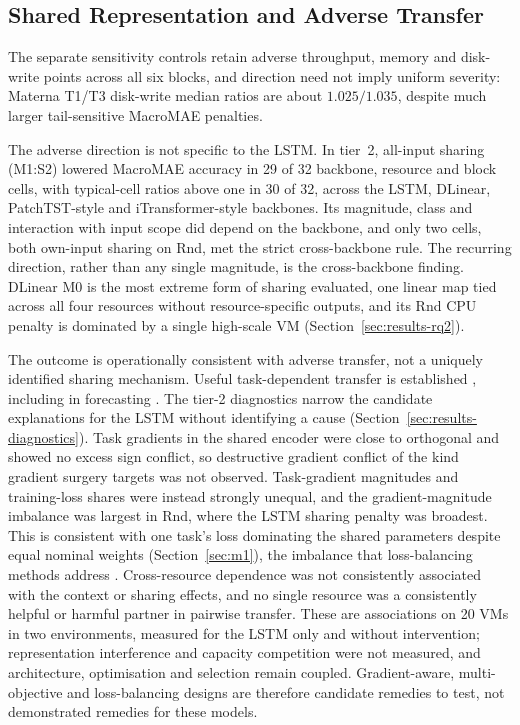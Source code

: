 \documentclass[5p,twocolumn]{elsarticle}
\begin{document}
\subsection{Shared Representation and Adverse Transfer}
\label{sec:discussion-sharing}

The separate sensitivity controls retain adverse throughput, memory and
disk-write points across all six blocks, and direction need not imply uniform
severity: Materna T1/T3 disk-write median ratios are about $1.025/1.035$,
despite much larger tail-sensitive MacroMAE penalties.

The adverse direction is not specific to the LSTM. In tier~2, all-input
sharing (M1:S2) lowered MacroMAE accuracy in 29 of 32 backbone, resource and
block cells, with typical-cell ratios above one in 30 of 32, across the
LSTM, DLinear, PatchTST-style and iTransformer-style backbones. Its
magnitude, class and interaction with input scope did depend on the
backbone, and only two cells, both own-input sharing on Rnd, met the strict
cross-backbone rule. The recurring direction, rather than any single
magnitude, is the cross-backbone finding. DLinear M0 is the most extreme
form of sharing evaluated, one linear map tied across all four resources
without resource-specific outputs, and its Rnd CPU penalty is dominated by a
single high-scale VM (Section~\ref{sec:results-rq2}).

The outcome is operationally consistent with adverse transfer, not a uniquely
identified sharing mechanism. Useful task-dependent transfer is established
\citep{Caruana1997Multitask,Standley2020TaskGrouping,Fifty2021TaskGroupings},
including in forecasting \citep{Nikentari2022NARMAXLSTM,Nochumsohn2025MTLinear}.
The tier-2 diagnostics narrow the candidate explanations for the LSTM
without identifying a cause (Section~\ref{sec:results-diagnostics}). Task
gradients in the shared encoder were close to orthogonal and showed no
excess sign conflict, so destructive gradient conflict of the kind gradient
surgery targets \citep{Yu2020GradientSurgery} was not observed. Task-gradient
magnitudes and training-loss shares were instead strongly unequal, and the
gradient-magnitude imbalance was largest in Rnd, where the LSTM sharing
penalty was broadest. This is consistent
with one task's loss dominating the shared parameters despite equal nominal
weights (Section~\ref{sec:m1}), the imbalance that loss-balancing methods
address \citep{Chen2018GradNorm}. Cross-resource dependence was not
consistently associated with the context or sharing effects, and no single resource was a consistently
helpful or harmful partner in pairwise transfer. These are associations on
20 VMs in two environments, measured for the LSTM only and without
intervention; representation interference and capacity competition were
not measured, and architecture, optimisation and selection remain coupled.
Gradient-aware, multi-objective and loss-balancing designs
\citep{Sener2018MultiObjective,Yu2020GradientSurgery,Chen2018GradNorm} are
therefore candidate remedies to test, not demonstrated remedies for these
models.
\end{document}
